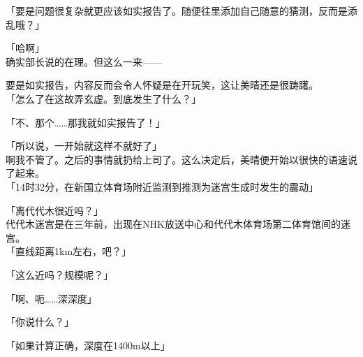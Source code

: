 「要是问题很复杂就更应该如实报告了。随便往里添加自己随意的猜测，反而是添乱哦？」

「哈啊」\\

确实部长说的在理。但这么一来——

要是如实报告，内容反而会令人怀疑是在开玩笑，这让美晴还是很踌躇。\\

「怎么了在这故弄玄虚。到底发生了什么？」

「不、那个……那我就如实报告了！」

「所以说，一开始就这样不就好了」\\

啊我不管了。之后的事情就扔给上司了。这么决定后，美晴便开始以很快的语速说了起来。\\

「14时32分，在新国立体育场附近监测到推测为迷宫生成时发生的震动」

「离代代木很近吗？」\\

代代木迷宫是在三年前，出现在NHK放送中心和代代木体育场第二体育馆间的迷宫。\\

「直线距离1km左右，吧？」

「这么近吗？规模呢？」

「啊、呃……深深度」

「你说什么？」

「如果计算正确，深度在1400m以上」

